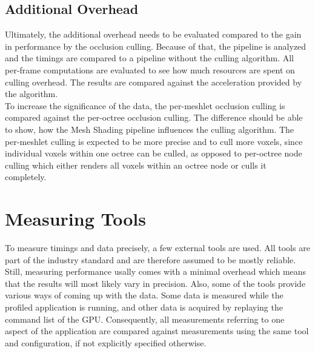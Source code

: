 

\subsection*{Additional Overhead}

Ultimately, the additional overhead needs to be evaluated compared to the gain in performance by the 
occlusion culling. Because of that, the pipeline is analyzed and the timings are compared to a pipeline 
without the culling algorithm. All per-frame computations are evaluated to see how much resources are 
spent on culling overhead. The results are compared against the acceleration provided by the algorithm.\\

\noindent
To increase the significance of the data, the per-meshlet occlusion culling is compared against the 
per-octree occlusion culling. The difference should be able to show, how the Mesh Shading pipeline 
influences the culling algorithm. The per-meshlet culling is expected to be more precise and to cull 
more voxels, since individual voxels within one octree can be culled, as opposed to per-octree node 
culling which either renders all voxels within an octree node or culls it completely. 

%
%


\section{Measuring Tools}

To measure timings and data precisely, a few external tools are used. All tools are part of the industry 
standard and are therefore assumed to be mostly reliable. Still, measuring performance usally comes with 
a minimal overhead which means that the results will most likely vary in precision. Also, some of the 
tools provide various ways of coming up with the data. Some data is measured while the profiled application 
is running, and other data is acquired by replaying the command list of the \ac{GPU}. Consequently, all 
measurements referring to one aspect of the application are compared against measurements using the same 
tool and configuration, if not explicitly specified otherwise. \\


